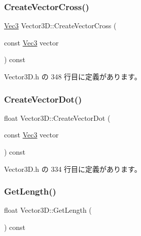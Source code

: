 \subsubsection{\texorpdfstring{Create\+Vector\+Cross()}{CreateVectorCross()}}
{\footnotesize\ttfamily \mbox{\hyperlink{_vector3_d_8h_ab16f59e4393f29a01ec8b9bbbabbe65d}{Vec3}} Vector3\+D\+::\+Create\+Vector\+Cross (\begin{DoxyParamCaption}\item[{const \mbox{\hyperlink{_vector3_d_8h_ab16f59e4393f29a01ec8b9bbbabbe65d}{Vec3}}}]{vector }\end{DoxyParamCaption}) const\hspace{0.3cm}{\ttfamily [inline]}}



 Vector3\+D.\+h の 348 行目に定義があります。

\mbox{\label{class_vector3_d_aed4c9936346cfbcb7238bd64ae1601d3}} 
\subsubsection{\texorpdfstring{Create\+Vector\+Dot()}{CreateVectorDot()}}
{\footnotesize\ttfamily float Vector3\+D\+::\+Create\+Vector\+Dot (\begin{DoxyParamCaption}\item[{const \mbox{\hyperlink{_vector3_d_8h_ab16f59e4393f29a01ec8b9bbbabbe65d}{Vec3}}}]{vector }\end{DoxyParamCaption}) const\hspace{0.3cm}{\ttfamily [inline]}}



 Vector3\+D.\+h の 334 行目に定義があります。

\mbox{\label{class_vector3_d_a8b10872079076291bbbc81b7d48aa514}} 
\subsubsection{\texorpdfstring{Get\+Length()}{GetLength()}}
{\footnotesize\ttfamily float Vector3\+D\+::\+Get\+Length (\begin{DoxyParamCaption}{ }\end{DoxyParamCaption}) const\hspace{0.3cm}{\ttfamily [inline]}}



